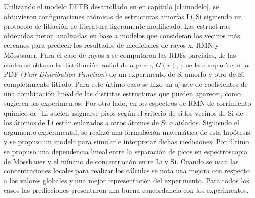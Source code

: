 Utilizando el modelo DFTB desarrollado en en capítulo \ref{ch:modelo}, se 
obtuvieron configuraciones atómicas de estructuras amorfas Li$_x$Si siguiendo un 
protocolo de litiación de literatura ligeramente modificado. Las estructuras 
obtenidas fueron analizadas en base a modelos que consideran los vecinos más 
cercanos para predecir los resultados de mediciones de rayos x, RMN y Mössbauer.
Para el caso de rayos x se computaron las RDFs parciales, de las cuales se obtuvo
la distribución radial de a pares, $G(r)$, y se la comparó con la PDF 
(\textit{Pair Distribution Function}) de un experimento de Si amorfo y otro de Si
completamente litiado. Para este último caso se hizo un ajuste de coeficientes de 
una combinación lineal de las distintas estructuras que pueden aparecer, como 
sugieren los experimentos. Por otro lado, en los espectros de RMN de corrimiento 
químico de $^7$Li suelen asignarse picos según el criterio de si los vecinos de Si de los átomos de Li están
enlazados a otros átomos de Si o aislados. Siguiendo el argumento experimental, se realizó una 
formulación matemática de esta hipótesis y se propuso un modelo para simular e 
interpretar dichas mediciones. Por último, se propuso una dependencia lineal 
entre la separación de picos en espectroscopia de Mössbauer y el mínimo de 
concentración entre Li y Si. Cuando se usan las concentraciones locales para 
realizar los cálculos se nota una mejora con respecto a los valores globales y
una mejor representación del experimento. Para todos los casos las predicciones
presentaron una buena concordancia con los experimentos.
